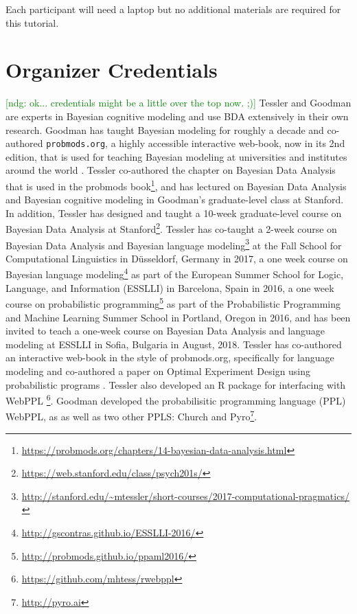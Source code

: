 \documentclass[10pt,letterpaper]{article}
\newcommand{\ndg}[1]{\textcolor{green}{[ndg: #1]}}
\begin{document}
Each participant will need a laptop but no additional materials are required for this tutorial. 

\section{Organizer Credentials}
\ndg{ok... credentials might be a little over the top now. ;)}
Tessler and Goodman are experts in Bayesian cognitive modeling and use BDA extensively in their own research. 
Goodman has taught Bayesian modeling for roughly a decade and co-authored \texttt{probmods.org}, a highly accessible interactive web-book, now in its 2nd edition, that is used for teaching Bayesian modeling at universities and institutes around the world \cite{probmods2}. 
Tessler co-authored the chapter on Bayesian Data Analysis that is used in the probmods book\footnote{\url{https://probmods.org/chapters/14-bayesian-data-analysis.html}}, 
and has lectured on Bayesian Data Analysis and Bayesian cognitive modeling in Goodman's graduate-level class at Stanford.
In addition, Tessler has designed and taught a 10-week graduate-level course on Bayesian Data Analysis at Stanford\footnote{
\url{https://web.stanford.edu/class/psych201s/}}.
Tessler has co-taught a 2-week course on Bayesian Data Analysis and Bayesian language modeling\footnote{\url{http://stanford.edu/~mtessler/short-courses/2017-computational-pragmatics/}} at the Fall School for Computational Linguistics in D\"{u}sseldorf, Germany in 2017, a one week course on Bayesian language modeling\footnote{\url{http://gscontras.github.io/ESSLLI-2016/}} as part of the European Summer School for Logic, Language, and Information (ESSLLI) in Barcelona, Spain in 2016, a one week course on probabilistic programming\footnote{\url{http://probmods.github.io/ppaml2016/}} as part of the Probabilistic Programming and Machine Learning Summer School in Portland, Oregon in 2016, and has been invited to teach a one-week course on Bayesian Data Analysis and language modeling at ESSLLI in Sofia, Bulgaria in August, 2018.
Tessler has co-authored an interactive web-book in the style of probmods.org, specifically for language modeling \cite{problang} and co-authored a paper on Optimal Experiment Design using probabilistic programs \cite{ouyangArxivOED}.  
Tessler also developed an R package for interfacing with WebPPL \footnote{\url{https://github.com/mhtess/rwebppl}}.
Goodman developed the probabilisitic programming language (PPL) WebPPL, as as well as two other PPLS: Church \cite{church} and Pyro\footnote{\url{http://pyro.ai}}.




\setlength{\bibleftmargin}{.125in}
\setlength{\bibindent}{-\bibleftmargin}


\end{document}
